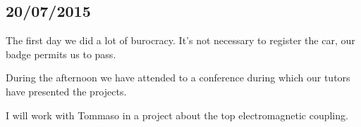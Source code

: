 \subsection{20/07/2015}
The first day we did a lot of burocracy. It's not necessary to register the car, our badge permits us to pass.

During the afternoon we have attended to a conference during which our tutors have presented the projects.

I will work with Tommaso in a project about the top electromagnetic coupling.
